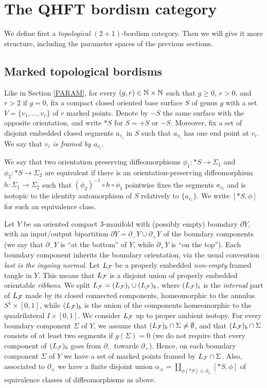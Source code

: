 \section{The QHFT bordism category}\label{BORDCAT}
We define first a {\it topological} $(2+1)$-bordism category. Then we
will give it more structure, including the parameter spaces of the
previous sections.

\subsection{Marked topological bordisms}\label{top-bord}
Like in Section \ref{PARAM}, for every $(g,r)\in {\mathbb N} \times {\mathbb N}$
such that $g\geq 0$, $r>0$, and $r>2$ if $g=0$, fix a compact
closed oriented base surface $S$ of genus $g$ with a set
$V=\{v_1,\ldots,v_r\}$ of $r$ marked points. Denote by $-S$ the
same surface with the opposite orientation, and write $*S$ for
$S=+S$ or $-S$. Moreover, fix a set of disjoint embedded closed
segments $a_{v_i}$ in $S$ such that $a_{v_i}$ has one end point at
$v_i$. We say that {\it $v_i$ is framed by $a_{v_i}$}.

We say that two orientation preserving diffeomorphisms $\phi_1: *
S \to \Sigma_1$ and $\phi_2: * S \to \Sigma_2$ are equivalent if
there is an orientation-preserving diffeomorphism $h: \Sigma_1 \to
\Sigma_2$ such that $(\phi_2)^{-1}\circ h \circ \phi_1$ pointwise
fixes the segments $a_{v_i}$ and is isotopic to the identity
automorphism of $S$ relatively to $\{a_{v_i}\}$. We write $[*
S,\phi]$ for such an equivalence class.

Let $Y$ be an oriented compact $3$-manifold with (possibly empty)
boundary $\partial Y$, with an input/output bipartition $\partial Y =
\partial_-Y \cup \partial_+ Y$ of the boundary components (we say that
$\partial_- Y$ is ``at the bottom'' of $Y$, while $\partial_+Y$ is
``on the top'').  Each boundary component inherits the boundary
orientation, via the usual convention {\it last is the ingoing
normal}. Let $L_{\mathcal F}$ be a properly embedded {\it non-empty} framed
tangle in $Y$. This means that $L_{\mathcal F}$ is a disjoint union of properly
embedded orientable {\it ribbons}. We split $L_{\mathcal F} = (L_{\mathcal F})_i\cup
(L_{\mathcal F})_b$, where $(L_{\mathcal F})_i$ is the {\it internal} part of $L_{\mathcal F}$
made by its closed connected components, homeomorphic to the annulus
$S^1 \times [0,1]$, while $(L_{\mathcal F})_b$ is the union of the components
homeomorphic to the quadrilateral $I\times [0,1]$.  We consider
$L_{\mathcal F}$ up to proper ambient isotopy. For every boundary component
$\Sigma$ of $Y$, we assume that $(L_{\mathcal F})_b\cap \Sigma \ne \emptyset$,
and that $(L_{\mathcal F})_b\cap \Sigma$ consists of at least two segments if
$g(\Sigma)=0$ (we do not require that every component of $(L_{\mathcal F})_b$
goes from $\partial_-$ towards $\partial_+$). Hence, on each
boundary component $\Sigma$ of $Y$ we have a set of marked points
framed by $L_{\mathcal F} \cap \Sigma$. Also, associated to $\partial_\pm$ we
have a finite disjoint union $\textstyle \alpha_\pm = \coprod_{\phi(*
S) \in \partial_\pm} [*S,\phi]$ of equivalence classes of
diffeomorphisms as above.

